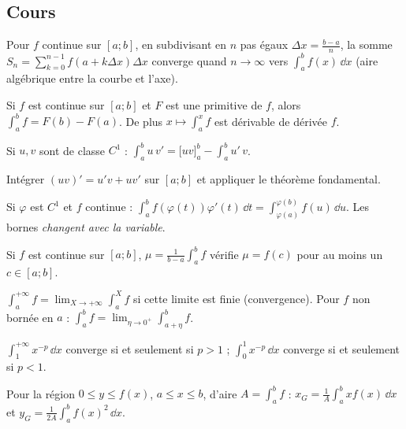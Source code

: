 \subsection{Cours}
\begin{definition}
Pour $f$ continue sur $[a;b]$, en subdivisant en $n$ pas égaux $\Delta x=\frac{b-a}n$, la somme $S_n=\sum_{k=0}^{n-1}f(a+k\Delta x)\Delta x$ converge quand $n\to\infty$ vers $\int_a^bf(x)\,\dd x$ (aire algébrique entre la courbe et l'axe).
\end{definition}
\begin{propriete}
Si $f$ est continue sur $[a;b]$ et $F$ est une primitive de $f$, alors $\int_a^bf=F(b)-F(a)$. De plus $x\mapsto\int_a^xf$ est dérivable de dérivée $f$.
\end{propriete}
\begin{propriete}
Si $u,v$ sont de classe $C^1$ : $\displaystyle\int_a^bu\,v'=\big[uv\big]_a^b-\int_a^bu'\,v$.
\end{propriete}
\begin{demonstration}
Intégrer $(uv)'=u'v+uv'$ sur $[a;b]$ et appliquer le théorème fondamental.
\end{demonstration}
\begin{propriete}
Si $\varphi$ est $C^1$ et $f$ continue : $\displaystyle\int_a^bf(\varphi(t))\varphi'(t)\,\dd t=\int_{\varphi(a)}^{\varphi(b)}f(u)\,\dd u$. Les bornes \emph{changent avec la variable}.
\end{propriete}
\begin{propriete}
Si $f$ est continue sur $[a;b]$, $\mu=\frac1{b-a}\int_a^bf$ vérifie $\mu=f(c)$ pour au moins un $c\in[a;b]$.
\end{propriete}
\begin{definition}
$\int_a^{+\infty}f=\lim_{X\to+\infty}\int_a^Xf$ si cette limite est finie (convergence). Pour $f$ non bornée en $a$ : $\int_a^bf=\lim_{\eta\to0^+}\int_{a+\eta}^bf$.
\end{definition}
\begin{propriete}
$\int_1^{+\infty}x^{-p}\,\dd x$ converge si et seulement si $p>1$ ; $\int_0^1x^{-p}\,\dd x$ converge si et seulement si $p<1$.
\end{propriete}
\begin{definition}
Pour la région $0\le y\le f(x)$, $a\le x\le b$, d'aire $A=\int_a^bf$ : $x_G=\frac1A\int_a^bxf(x)\,\dd x$ et $y_G=\frac1{2A}\int_a^bf(x)^2\,\dd x$.
\end{definition}
